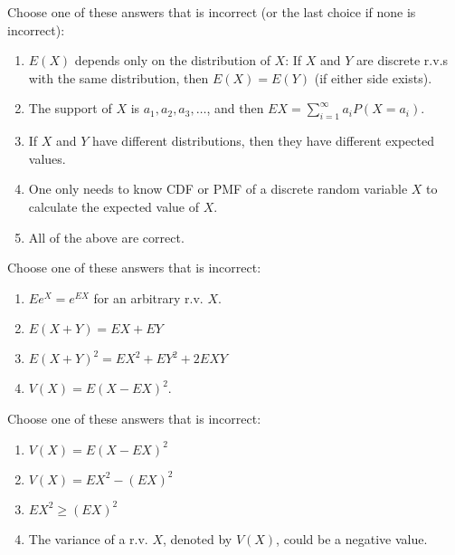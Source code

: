 \documentclass[poll_tutorial_format]{subfiles}
\begin{document}
	\begin{exercise}
		Choose one of these answers that is incorrect (or the last choice if none is incorrect):%
		\begin{enumerate}
			\item $E(X)$ depends only on the distribution of $X$: If $X$ and $Y$ are discrete r.v.s with the same distribution, then $E(X) = E(Y)$ (if either side exists).
			\item The support of $X$ is $a_1, a_2, a_3, \dots$, and then $EX=\sum_{i=1}^\infty a_i P(X=a_i)$.
			\item If $X$ and $Y$ have different distributions, then they have different expected values. 
			\item One only needs to know CDF or PMF of a discrete random variable $X$ to calculate the expected value of $X$.
			\item All of the above are correct. 
		\end{enumerate}
	\end{exercise}
	
	
	\begin{exercise}
		Choose one of these answers that is incorrect:%
		\begin{enumerate}
			\item $Ee^X=e^{EX}$ for an arbitrary r.v. $X$.  
			\item $E(X+Y)=EX+EY$
			\item $E(X+Y)^2 =EX^2 +EY^2 +2EXY$  
			\item $V(X)=E\left(X-EX \right)^2$.  
		\end{enumerate}
	\end{exercise}
	
	
		
	\begin{exercise}
		Choose one of these answers that is incorrect:%
		\begin{enumerate}
			\item $V(X)=E\left(X-EX \right)^2$  
			\item $V(X)=EX^2 -\left(EX \right)^2$
			\item $EX^2 \geq \left(EX \right)^2$  
			\item The variance of a r.v. $X$, denoted by $V(X)$, could be a negative value.
		\end{enumerate}
	\end{exercise}
	
\end{document}
